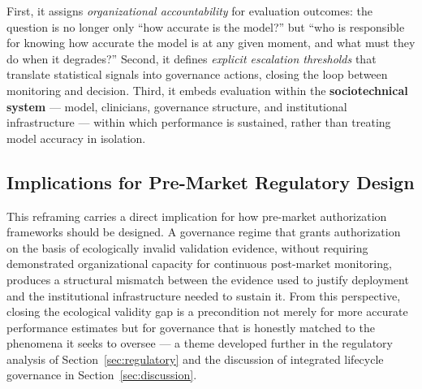 First, it assigns \textit{organizational accountability} for evaluation
outcomes: the question is no longer only ``how accurate is the model?'' but
``who is responsible for knowing how accurate the model is at any given
moment, and what must they do when it degrades?'' Second, it defines
\textit{explicit escalation thresholds} that translate statistical signals
into governance actions, closing the loop between monitoring and decision.
Third, it embeds evaluation within the \textbf{sociotechnical system} ---
model, clinicians, governance structure, and institutional infrastructure
--- within which performance is sustained, rather than treating model
accuracy in isolation.

\subsection{Implications for Pre-Market Regulatory Design}

This reframing carries a direct implication for how pre-market authorization
frameworks should be designed. A governance regime that grants authorization
on the basis of ecologically invalid validation evidence, without requiring
demonstrated organizational capacity for continuous post-market monitoring,
produces a structural mismatch between the evidence used to justify
deployment and the institutional infrastructure needed to sustain it. From
this perspective, closing the ecological validity gap is a precondition
not merely for more accurate performance estimates but for governance
that is honestly matched to the phenomena it seeks to oversee --- a theme
developed further in the regulatory analysis of
Section~\ref{sec:regulatory} and the discussion of integrated
lifecycle governance in Section~\ref{sec:discussion}.
